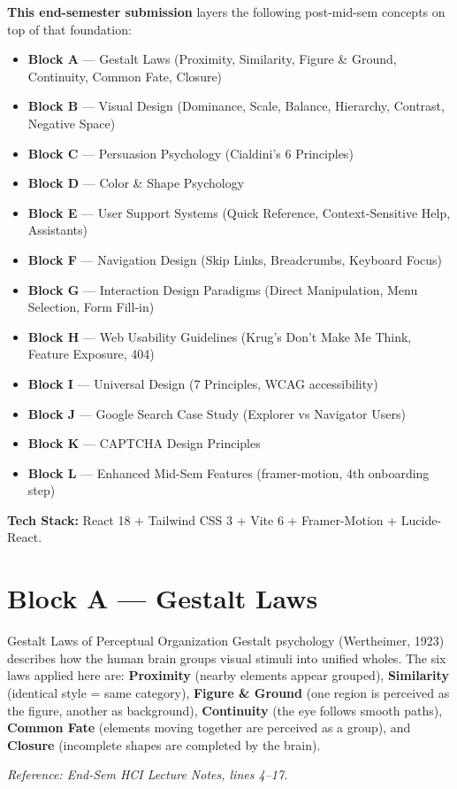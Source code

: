 \documentclass[12pt, a4paper]{article}
\begin{document}
\textbf{This end-semester submission} layers the following post-mid-sem concepts on top of that foundation:

\begin{itemize}[leftmargin=1.5em]
  \item \textbf{Block A} --- Gestalt Laws (Proximity, Similarity, Figure \& Ground, Continuity, Common Fate, Closure)
  \item \textbf{Block B} --- Visual Design (Dominance, Scale, Balance, Hierarchy, Contrast, Negative Space)
  \item \textbf{Block C} --- Persuasion Psychology (Cialdini's 6 Principles)
  \item \textbf{Block D} --- Color \& Shape Psychology
  \item \textbf{Block E} --- User Support Systems (Quick Reference, Context-Sensitive Help, Assistants)
  \item \textbf{Block F} --- Navigation Design (Skip Links, Breadcrumbs, Keyboard Focus)
  \item \textbf{Block G} --- Interaction Design Paradigms (Direct Manipulation, Menu Selection, Form Fill-in)
  \item \textbf{Block H} --- Web Usability Guidelines (Krug's Don't Make Me Think, Feature Exposure, 404)
  \item \textbf{Block I} --- Universal Design (7 Principles, WCAG accessibility)
  \item \textbf{Block J} --- Google Search Case Study (Explorer vs Navigator Users)
  \item \textbf{Block K} --- CAPTCHA Design Principles
  \item \textbf{Block L} --- Enhanced Mid-Sem Features (framer-motion, 4th onboarding step)
\end{itemize}

\textbf{Tech Stack:} React 18 + Tailwind CSS 3 + Vite 6 + Framer-Motion + Lucide-React.

\vspace{0.5cm}

\section{Block A --- Gestalt Laws}

\begin{hcibox}{Gestalt Laws of Perceptual Organization}
Gestalt psychology (Wertheimer, 1923) describes how the human brain groups visual stimuli into unified wholes. The six laws applied here are: \textbf{Proximity} (nearby elements appear grouped), \textbf{Similarity} (identical style = same category), \textbf{Figure \& Ground} (one region is perceived as the figure, another as background), \textbf{Continuity} (the eye follows smooth paths), \textbf{Common Fate} (elements moving together are perceived as a group), and \textbf{Closure} (incomplete shapes are completed by the brain).

\textit{Reference: End-Sem HCI Lecture Notes, lines 4--17.}
\end{hcibox}
\end{document}
